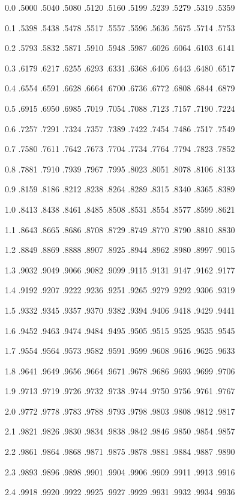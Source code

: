 \documentclass[12pt,fleqn]{article}\usepackage{../../common}
\begin{document}
0.0 .5000 .5040 .5080 .5120 .5160 .5199 .5239 .5279 .5319 .5359

0.1 .5398 .5438 .5478 .5517 .5557 .5596 .5636 .5675 .5714 .5753

0.2 .5793 .5832 .5871 .5910 .5948 .5987 .6026 .6064 .6103 .6141

0.3 .6179 .6217 .6255 .6293 .6331 .6368 .6406 .6443 .6480 .6517

0.4 .6554 .6591 .6628 .6664 .6700 .6736 .6772 .6808 .6844 .6879

0.5 .6915 .6950 .6985 .7019 .7054 .7088 .7123 .7157 .7190 .7224

0.6 .7257 .7291 .7324 .7357 .7389 .7422 .7454 .7486 .7517 .7549

0.7 .7580 .7611 .7642 .7673 .7704 .7734 .7764 .7794 .7823 .7852

0.8 .7881 .7910 .7939 .7967 .7995 .8023 .8051 .8078 .8106 .8133

0.9 .8159 .8186 .8212 .8238 .8264 .8289 .8315 .8340 .8365 .8389

1.0 .8413 .8438 .8461 .8485 .8508 .8531 .8554 .8577 .8599 .8621

1.1 .8643 .8665 .8686 .8708 .8729 .8749 .8770 .8790 .8810 .8830

1.2 .8849 .8869 .8888 .8907 .8925 .8944 .8962 .8980 .8997 .9015

1.3 .9032 .9049 .9066 .9082 .9099 .9115 .9131 .9147 .9162 .9177

1.4 .9192 .9207 .9222 .9236 .9251 .9265 .9279 .9292 .9306 .9319

1.5 .9332 .9345 .9357 .9370 .9382 .9394 .9406 .9418 .9429 .9441

1.6 .9452 .9463 .9474 .9484 .9495 .9505 .9515 .9525 .9535 .9545

1.7 .9554 .9564 .9573 .9582 .9591 .9599 .9608 .9616 .9625 .9633

1.8 .9641 .9649 .9656 .9664 .9671 .9678 .9686 .9693 .9699 .9706

1.9 .9713 .9719 .9726 .9732 .9738 .9744 .9750 .9756 .9761 .9767

2.0 .9772 .9778 .9783 .9788 .9793 .9798 .9803 .9808 .9812 .9817

2.1 .9821 .9826 .9830 .9834 .9838 .9842 .9846 .9850 .9854 .9857

2.2 .9861 .9864 .9868 .9871 .9875 .9878 .9881 .9884 .9887 .9890

2.3 .9893 .9896 .9898 .9901 .9904 .9906 .9909 .9911 .9913 .9916

2.4 .9918 .9920 .9922 .9925 .9927 .9929 .9931 .9932 .9934 .9936
\end{document}
